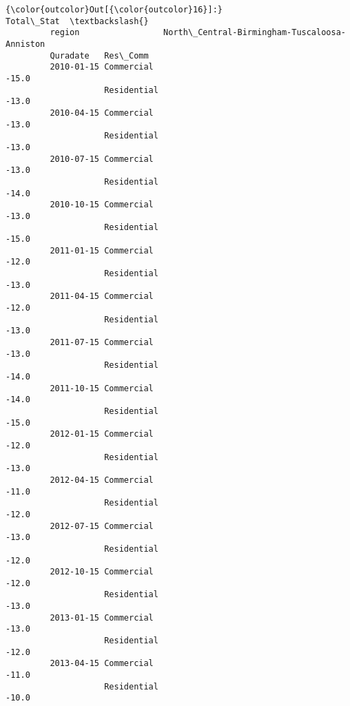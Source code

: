 \documentclass[11pt]{article}
\begin{document}
\begin{Verbatim}[commandchars=\\\{\}]
{\color{outcolor}Out[{\color{outcolor}16}]:}                                                          Total\_Stat  \textbackslash{}
         region                 North\_Central-Birmingham-Tuscaloosa-Anniston   
         Quradate   Res\_Comm                                                   
         2010-01-15 Commercial                                         -15.0   
                    Residential                                        -13.0   
         2010-04-15 Commercial                                         -13.0   
                    Residential                                        -13.0   
         2010-07-15 Commercial                                         -13.0   
                    Residential                                        -14.0   
         2010-10-15 Commercial                                         -13.0   
                    Residential                                        -15.0   
         2011-01-15 Commercial                                         -12.0   
                    Residential                                        -13.0   
         2011-04-15 Commercial                                         -12.0   
                    Residential                                        -13.0   
         2011-07-15 Commercial                                         -13.0   
                    Residential                                        -14.0   
         2011-10-15 Commercial                                         -14.0   
                    Residential                                        -15.0   
         2012-01-15 Commercial                                         -12.0   
                    Residential                                        -13.0   
         2012-04-15 Commercial                                         -11.0   
                    Residential                                        -12.0   
         2012-07-15 Commercial                                         -13.0   
                    Residential                                        -12.0   
         2012-10-15 Commercial                                         -12.0   
                    Residential                                        -13.0   
         2013-01-15 Commercial                                         -13.0   
                    Residential                                        -12.0   
         2013-04-15 Commercial                                         -11.0   
                    Residential                                        -10.0   

\end{Verbatim}
\end{document}
